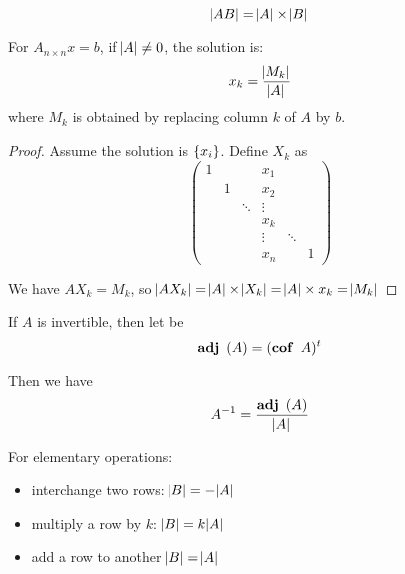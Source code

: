 \begin{theorem}
    \begin{equation}
        \abs{AB} = \abs{A} \times \abs{B}
    \end{equation}    
\end{theorem}


\begin{theorem}
    For $A_{n \times n}x=b$, if $\abs{A} \neq 0$, the solution is:
    \begin{equation}
        x_k = \frac{\abs{M_k}}{\abs{A}}
    \end{equation}
    where $M_k$ is obtained by replacing column $k$ of $A$ by $b$.
\end{theorem}
\begin{proof}
    Assume the solution is $\set{x_i}$. Define $X_k$ as 
    \begin{equation*}
        \begin{pmatrix}
        1 &   &   & x_1 &  \\
          & 1 &   & x_2 &  \\
          &   & \ddots & \vdots \\
          &   &        &  x_k & \\
          &&& \vdots & \ddots \\
          &&& x_n & & 1          
        \end{pmatrix}
    \end{equation*}
    
    We have $A X_k = M_k$, so $\abs{A X_k} = \abs{A} \times \abs{X_k} = \abs{A} \times x_k = \abs{M_k}$
\end{proof}

\begin{theorem}
    If $A$ is invertible, then let  be
    \begin{equation}
        \displaystyle \mathop{\bf adj\/}~\left( A \right) = (\displaystyle \mathop{\bf cof\/}~\displaystyle A)^t
    \end{equation}
    
    Then we have
    \begin{equation}
        {A}^{-1} = \frac{\displaystyle \mathop{\bf adj\/}~\left( A \right)}{\abs{A}}
    \end{equation}    
\end{theorem}


\begin{theorem}
  For elementary operations:
\begin{itemize}
    \item interchange two rows: $\abs{B} = - \abs{A}$ 
    \item multiply a row by $k$: $\abs{B} = k \abs{A}$
    \item add a row to another $\abs{B} = \abs{A}$
\end{itemize}  
\end{theorem}

